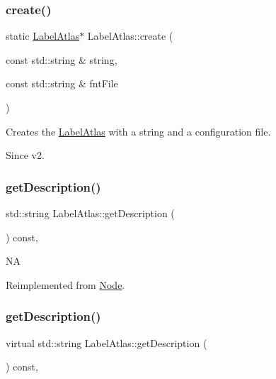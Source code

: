 \subsubsection{\texorpdfstring{create()}{create()}\hspace{0.1cm}{\footnotesize\ttfamily [6/6]}}
{\footnotesize\ttfamily static \hyperlink{classLabelAtlas}{Label\+Atlas}$\ast$ Label\+Atlas\+::create (\begin{DoxyParamCaption}\item[{const std\+::string \&}]{string,  }\item[{const std\+::string \&}]{fnt\+File }\end{DoxyParamCaption})\hspace{0.3cm}{\ttfamily [static]}}

Creates the \hyperlink{classLabelAtlas}{Label\+Atlas} with a string and a configuration file. \begin{DoxySince}{Since}
v2. 
\end{DoxySince}
\mbox{\label{classLabelAtlas_aad009427295f2927b45a81a0f1af440d}} 
\subsubsection{\texorpdfstring{get\+Description()}{getDescription()}\hspace{0.1cm}{\footnotesize\ttfamily [1/2]}}
{\footnotesize\ttfamily std\+::string Label\+Atlas\+::get\+Description (\begin{DoxyParamCaption}{ }\end{DoxyParamCaption}) const\hspace{0.3cm}{\ttfamily [override]}, {\ttfamily [virtual]}}

NA 

Reimplemented from \hyperlink{classNode_a41710375a0d92a4ee54c39fe123b5912}{Node}.

\mbox{\label{classLabelAtlas_a31869bda92ecc664002ebd96b979d099}} 
\subsubsection{\texorpdfstring{get\+Description()}{getDescription()}\hspace{0.1cm}{\footnotesize\ttfamily [2/2]}}
{\footnotesize\ttfamily virtual std\+::string Label\+Atlas\+::get\+Description (\begin{DoxyParamCaption}{ }\end{DoxyParamCaption}) const\hspace{0.3cm}{\ttfamily [override]}, {\ttfamily [virtual]}}

